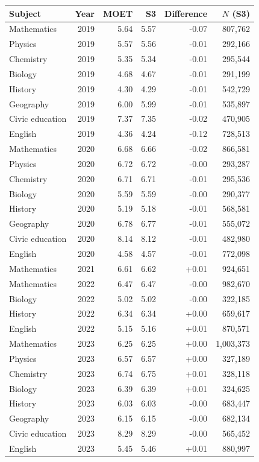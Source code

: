 \begin{tabular}{@{}lrrrrr@{}}
\toprule
Subject & Year & MOET & S3 & Difference & $N$ (S3) \\
\midrule
Mathematics & 2019 & 5.64 & 5.57 & -0.07 & 807,762 \\
Physics & 2019 & 5.57 & 5.56 & -0.01 & 292,166 \\
Chemistry & 2019 & 5.35 & 5.34 & -0.01 & 295,544 \\
Biology & 2019 & 4.68 & 4.67 & -0.01 & 291,199 \\
History & 2019 & 4.30 & 4.29 & -0.01 & 542,729 \\
Geography & 2019 & 6.00 & 5.99 & -0.01 & 535,897 \\
Civic education & 2019 & 7.37 & 7.35 & -0.02 & 470,905 \\
English & 2019 & 4.36 & 4.24 & -0.12 & 728,513 \\
Mathematics & 2020 & 6.68 & 6.66 & -0.02 & 866,581 \\
Physics & 2020 & 6.72 & 6.72 & -0.00 & 293,287 \\
Chemistry & 2020 & 6.71 & 6.71 & -0.01 & 295,536 \\
Biology & 2020 & 5.59 & 5.59 & -0.00 & 290,377 \\
History & 2020 & 5.19 & 5.18 & -0.01 & 568,581 \\
Geography & 2020 & 6.78 & 6.77 & -0.01 & 555,072 \\
Civic education & 2020 & 8.14 & 8.12 & -0.01 & 482,980 \\
English & 2020 & 4.58 & 4.57 & -0.01 & 772,098 \\
Mathematics & 2021 & 6.61 & 6.62 & +0.01 & 924,651 \\
Mathematics & 2022 & 6.47 & 6.47 & -0.00 & 982,670 \\
Biology & 2022 & 5.02 & 5.02 & -0.00 & 322,185 \\
History & 2022 & 6.34 & 6.34 & +0.00 & 659,617 \\
English & 2022 & 5.15 & 5.16 & +0.01 & 870,571 \\
Mathematics & 2023 & 6.25 & 6.25 & +0.00 & 1,003,373 \\
Physics & 2023 & 6.57 & 6.57 & +0.00 & 327,189 \\
Chemistry & 2023 & 6.74 & 6.75 & +0.01 & 328,118 \\
Biology & 2023 & 6.39 & 6.39 & +0.01 & 324,625 \\
History & 2023 & 6.03 & 6.03 & -0.00 & 683,447 \\
Geography & 2023 & 6.15 & 6.15 & -0.00 & 682,134 \\
Civic education & 2023 & 8.29 & 8.29 & -0.00 & 565,452 \\
English & 2023 & 5.45 & 5.46 & +0.01 & 880,997 \\
\bottomrule
\end{tabular}
